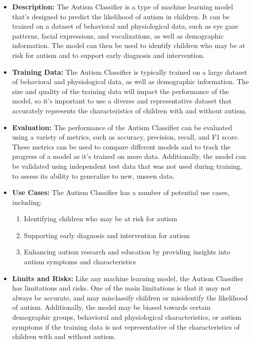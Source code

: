 \begin{itemize}
    \item \textbf{Description:} The Autism Classifier is a type of machine learning model that's designed to predict the likelihood of autism in children. It can be trained on a dataset of behavioral and physiological data, such as eye gaze patterns, facial expressions, and vocalizations, as well as demographic information. The model can then be used to identify children who may be at risk for autism and to support early diagnosis and intervention.
    \item \textbf{Training Data:} The Autism Classifier is typically trained on a large dataset of behavioral and physiological data, as well as demographic information. The size and quality of the training data will impact the performance of the model, so it's important to use a diverse and representative dataset that accurately represents the characteristics of children with and without autism.
    \item \textbf{Evaluation:} The performance of the Autism Classifier can be evaluated using a variety of metrics, such as accuracy, precision, recall, and F1 score. These metrics can be used to compare different models and to track the progress of a model as it's trained on more data. Additionally, the model can be validated using independent test data that was not used during training, to assess its ability to generalize to new, unseen data.
    \item \textbf{Use Cases:} The Autism Classifier has a number of potential use cases, including:
        \begin{enumerate}  
            \item Identifying children who may be at risk for autism
            \item Supporting early diagnosis and intervention for autism
            \item Enhancing autism research and education by providing insights into autism symptoms and characteristics
        \end{enumerate}
    \item \textbf{Limits and Risks:} Like any machine learning model, the Autism Classifier has limitations and risks. One of the main limitations is that it may not always be accurate, and may misclassify children or misidentify the likelihood of autism. Additionally, the model may be biased towards certain demographic groups, behavioral and physiological characteristics, or autism symptoms if the training data is not representative of the characteristics of children with and without autism.

\end{itemize}
